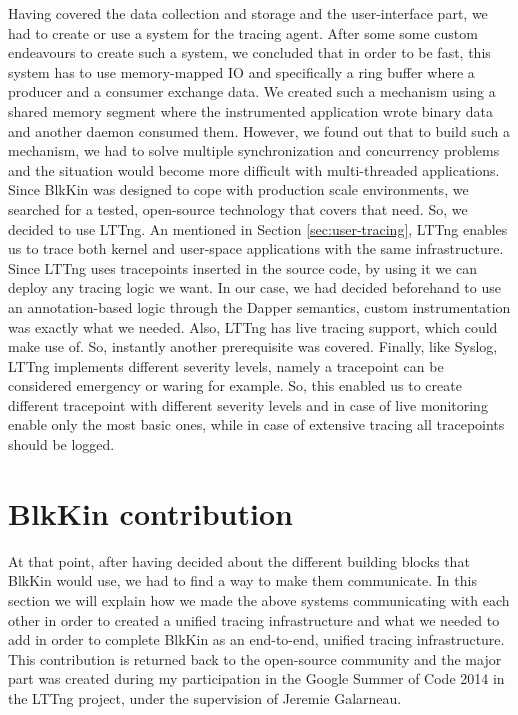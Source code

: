 Having covered the data collection and storage and the user-interface part, we
had to create or use a system for the tracing agent. After some some custom
endeavours to create such a system, we concluded that in order to be fast, this
system has to use memory-mapped IO and specifically a ring buffer where a
producer and a consumer exchange data. We created such a mechanism using a
shared memory segment where the instrumented application wrote binary data and
another daemon consumed them. However, we found out that to build such a
mechanism, we had to solve multiple synchronization and concurrency problems and
the situation would become more difficult with multi-threaded applications.
Since BlkKin was designed to cope with production scale environments, we
searched for a tested, open-source technology that covers that need. So, we
decided to use LTTng. An mentioned in Section \ref{sec:user-tracing}, LTTng
enables us to trace both kernel and user-space applications with the same
infrastructure. Since LTTng uses tracepoints inserted in the source code, by
using it we can deploy any tracing logic we want. In our case, we had decided
beforehand to use an annotation-based logic through the Dapper semantics, custom
instrumentation was exactly what we needed. Also, LTTng has live tracing
support, which could make use of. So, instantly another prerequisite was
covered. Finally, like Syslog, LTTng implements different severity levels,
namely a tracepoint can be considered emergency or waring for example. So, this
enabled us to create different tracepoint with different severity levels and in
case of live monitoring enable only the most basic ones, while in case of
extensive tracing all tracepoints should be logged.

\section{BlkKin contribution}\label{sec:contribution}

At that point, after having decided about the different building blocks that
BlkKin would use, we had to find a way to make them communicate. In this section
we will explain how we made the above systems communicating with each other in
order to created a unified tracing infrastructure and what we needed to add in
order to complete BlkKin as an end-to-end, unified tracing infrastructure. This
contribution is returned back to the open-source community and the major part
was created during my participation in the Google Summer of Code 2014 in the
LTTng project, under the supervision of Jeremie Galarneau.

